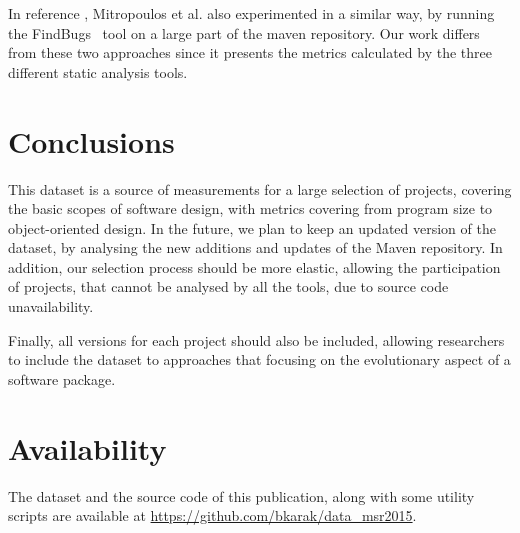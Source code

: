 \documentclass{sig-alternate}
\begin{document}
In reference \cite{MKLGS14}, Mitropoulos et al. also experimented in a similar way, by running the FindBugs~\cite{HP04} tool on a large part of the maven repository. Our work differs from these two approaches since it presents the metrics calculated by the three different static analysis tools.

\section{Conclusions}
\label{sec:conc}

This dataset is a source of measurements for a large selection of projects, covering the basic scopes of software design, with metrics covering from program size to object-oriented design. In the future, we plan to keep an updated version of the dataset, by analysing the new additions and updates of the Maven repository.
In addition, our selection process should be more elastic, allowing the participation of projects, that cannot be analysed by all the tools, due to source code unavailability.

Finally, all versions for each project should also be included, allowing researchers to include the dataset to approaches that focusing on the evolutionary aspect of a software package.

\section{Availability}

The dataset and the source code of this publication, along with some utility scripts are available at \url{https://github.com/bkarak/data_msr2015}.



\end{document}
